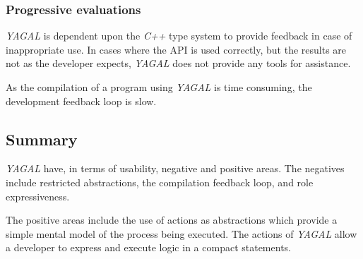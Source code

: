\subsubsection[*]{Progressive evaluations}
\textit{YAGAL} is dependent upon the \textit{C++} type system to provide feedback in case of inappropriate use. In cases where the API is used correctly, but the results are not as the developer expects, \textit{YAGAL} does not provide any tools for assistance.

As the compilation of a program using \textit{YAGAL} is time consuming, the development feedback loop is slow.

\subsection{Summary}

\textit{YAGAL} have, in terms of usability, negative and positive areas. The negatives include restricted abstractions, the compilation feedback loop, and role expressiveness.

The positive areas include the use of actions as abstractions which provide a simple mental model of the process being executed. The actions of \textit{YAGAL} allow a developer to express and execute  logic in a compact statements.
